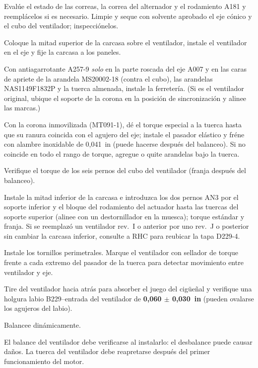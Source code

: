 \begin{pasos}
\item Evalúe el estado de las correas, la correa del alternador y el rodamiento A181 y reemplácelos si es necesario. Limpie y seque con solvente aprobado el eje cónico y el cubo del ventilador; inspecciónelos.
\item Coloque la mitad superior de la carcasa sobre el ventilador, instale el ventilador en el eje y fije la carcasa a los paneles.
\item Con antiagarrotante A257-9 \emph{solo} en la parte roscada del eje A007 y en las caras de apriete de la arandela MS20002-18 (contra el cubo), las arandelas NAS1149F1832P y la tuerca almenada, instale la ferretería. (Si es el ventilador original, ubique el soporte de la corona en la posición de sincronización y alinee las marcas.)
\item Con la corona inmovilizada (MT091-1), dé el torque especial a la tuerca hasta que su ranura coincida con el agujero del eje; instale el pasador elástico y fréne con alambre inoxidable de 0,041~in (puede hacerse después del balanceo). Si no coincide en todo el rango de torque, agregue o quite arandelas bajo la tuerca.
\item Verifique el torque de los seis pernos del cubo del ventilador (franja después del balanceo).
\item Instale la mitad inferior de la carcasa e introduzca los dos pernos AN3 por el soporte inferior y el bloque del rodamiento del actuador hasta las tuercas del soporte superior (alinee con un destornillador en la muesca); torque estándar y franja. Si se reemplazó un ventilador rev.~I o anterior por uno rev.~J o posterior sin cambiar la carcasa inferior, consulte a RHC para reubicar la tapa D229-4.
\item Instale los tornillos perimetrales. Marque el ventilador con sellador de torque frente a cada extremo del pasador de la tuerca para detectar movimiento entre ventilador y eje.
\item Tire del ventilador hacia atrás para absorber el juego del cigüeñal y verifique una holgura labio B229--entrada del ventilador de \textbf{0,060 $\pm$ 0,030~in} (pueden ovalarse los agujeros del labio).
\item Balancee dinámicamente.
\end{pasos}

\begin{precaucion}
El balance del ventilador debe verificarse al instalarlo: el desbalance puede causar daños. La tuerca del ventilador debe reapretarse después del primer funcionamiento del motor.
\end{precaucion}

